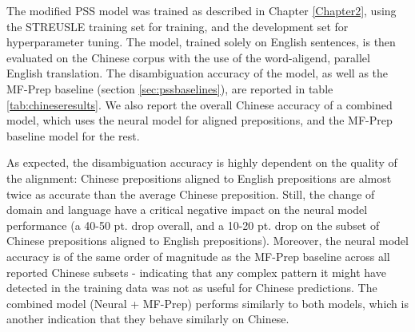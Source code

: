 The modified PSS model was trained as described in Chapter \ref{Chapter2}, using the STREUSLE training set for training, and the development set for hyperparameter tuning. The model, trained solely on English sentences, is then evaluated on the Chinese corpus with the use of the word-aligend, parallel English translation. The disambiguation accuracy of the model, as well as the MF-Prep baseline (section \ref{sec:pssbaselines}), are reported in table \ref{tab:chineseresults}. We also report the overall Chinese accuracy of a combined model, which uses the neural model for aligned prepositions, and the MF-Prep baseline model for the rest.

As expected, the disambiguation accuracy is highly dependent on the quality of the alignment: Chinese prepositions aligned to English prepositions are almost twice as accurate than the average Chinese preposition. Still, the change of domain and language have a critical negative impact on the neural model performance (a 40-50 pt. drop overall, and a 10-20 pt. drop on the subset of Chinese prepositions aligned to English prepositions). Moreover, the neural model accuracy is of the same order of magnitude as the MF-Prep baseline across all reported Chinese subsets - indicating that any complex pattern it might have detected in the training data was not as useful for Chinese predictions. The combined model (Neural + MF-Prep) performs similarly to both models, which is another indication that they behave similarly on Chinese.

